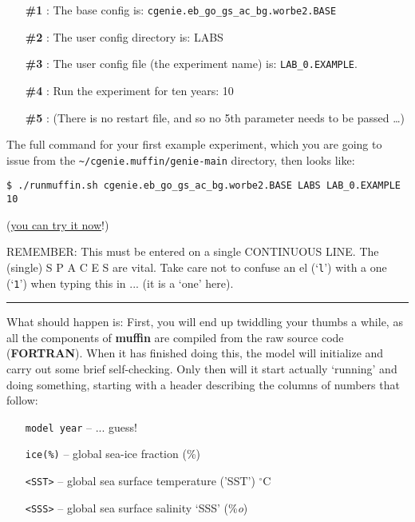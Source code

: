 \documentclass[11pt,fleqn]{book} %
\begin{document}
\vspace{2mm}
\begin{enumerate}[noitemsep]
\setlength{\itemindent}{.2in}
\item[\textbf{\#1}]: The base config is: \texttt{cgenie.eb\_go\_gs\_ac\_bg.worbe2.BASE}
\item[\textbf{\#2}]: The user config directory is: LABS
\item[\textbf{\#3}]: The user config file (the experiment name) is: \texttt{LAB\_0.EXAMPLE}.
\item[\textbf{\#4}]: Run the experiment for ten years: 10
\item[\textbf{\#5}]: (There is no restart file, and so no 5th parameter needs to be passed …)
\end{enumerate}

The full command for your first example experiment, which you are going to issue from the \texttt{\~}\texttt{/cgenie.muffin/genie-main} directory, then looks like:

\vspace{-1mm}
\begin{verbatim}
$ ./runmuffin.sh cgenie.eb_go_gs_ac_bg.worbe2.BASE LABS LAB_0.EXAMPLE 10
\end{verbatim}
\vspace{-1mm}

\noindent(\uline{you can try it now}!)

\vspace{2mm}
REMEMBER: This must be entered on a single CONTINUOUS LINE. The (single) S P A C E S are vital. Take care not to confuse an el (‘\texttt{l}’) with a one (‘\texttt{1}’) when typing this in ... (it is a ‘one’ here).

\vspace{1mm}
\noindent\rule{4cm}{0.1mm}
\vspace{2mm}

\noindent What should happen is: First, you will end up twiddling your thumbs a while, as all the components of \textbf{muffin} are compiled from the raw source code (\textbf{FORTRAN}). When it has finished doing this, the model will initialize and carry out some brief self-checking. Only then will it start actually ‘running’ and doing something, starting with a header describing the columns of numbers that follow:

\newpage

\begin{itemize}
\item[] \texttt{model year}  -- ... guess!
\item[] \texttt{ice(\%)} -- global sea-ice fraction (\%)
\item[] \texttt{<SST>} -- global sea surface temperature ('SST') $^{\circ}$C
\item[] \texttt{<SSS>} -- global sea surface salinity ‘SSS’ (\%\textit{o})
\end{itemize}
\end{document}
